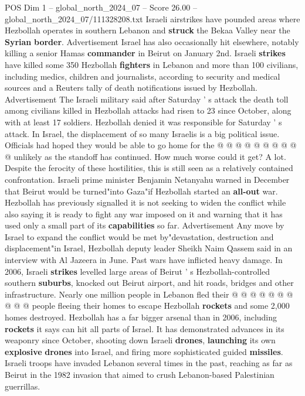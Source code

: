 \begin{textsample}{POS Dim 1 – global\_north\_2024\_07 – Score 26.00 – global\_north\_2024\_07/111328208.txt}
Israeli airstrikes have pounded areas where Hezbollah operates in southern Lebanon and \textbf{struck} the Bekaa Valley near the \textbf{Syrian} \textbf{border}.
Advertisement Israel has also occasionally hit elsewhere, notably killing a senior Hamas \textbf{commander} in Beirut on January 2nd.
Israeli \textbf{strikes} have killed some 350 Hezbollah \textbf{fighters} in Lebanon and more than 100 civilians, including medics, children and journalists, according to security and medical sources and a Reuters tally of death notifications issued by Hezbollah.
Advertisement The Israeli military said after Saturday ' s attack the death toll among civilians killed in Hezbollah attacks had risen to 23 since October, along with at least 17 soldiers.
Hezbollah denied it was responsible for Saturday ' s attack.
In Israel, the displacement of so many Israelis is a big political issue.
Officials had hoped they would be able to go home for the @ @ @ @ @ @ @ @ @ @ unlikely as the standoff has continued.
How much worse could it get?
A lot.
Despite the ferocity of these hostilities, this is still seen as a relatively contained confrontation.
Israeli prime minister Benjamin Netanyahu warned in December that Beirut would be turned"into Gaza"if Hezbollah started an \textbf{all-out} war.
Hezbollah has previously signalled it is not seeking to widen the conflict while also saying it is ready to fight any war imposed on it and warning that it has used only a small part of its \textbf{capabilities} so far.
Advertisement Any move by Israel to expand the conflict would be met by"devastation, destruction and displacement"in Israel, Hezbollah deputy leader Sheikh Naim Qassem said in an interview with Al Jazeera in June.
Past wars have inflicted heavy damage.
In 2006, Israeli \textbf{strikes} levelled large areas of Beirut ' s Hezbollah-controlled southern \textbf{suburbs}, knocked out Beirut airport, and hit roads, bridges and other infrastructure.
Nearly one million people in Lebanon fled their @ @ @ @ @ @ @ @ @ @ people fleeing their homes to escape Hezbollah \textbf{rockets} and some 2,000 homes destroyed.
Hezbollah has a far bigger arsenal than in 2006, including \textbf{rockets} it says can hit all parts of Israel.
It has demonstrated advances in its weaponry since October, shooting down Israeli \textbf{drones}, \textbf{launching} its own \textbf{explosive} \textbf{drones} into Israel, and firing more sophisticated guided \textbf{missiles}.
Israeli troops have invaded Lebanon several times in the past, reaching as far as Beirut in the 1982 invasion that aimed to crush Lebanon-based Palestinian guerrillas.

\end{textsample}
